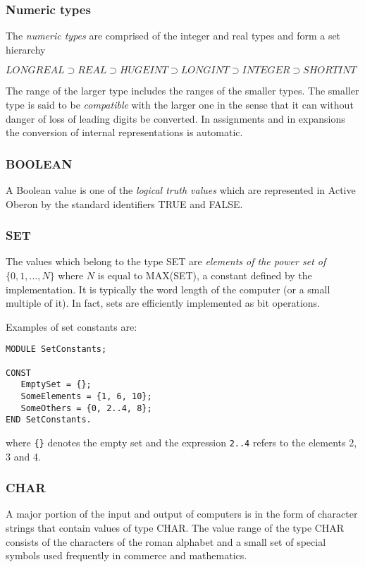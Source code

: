 \documentclass[a4paper,11pt]{article}
\begin{document}
\subsubsection{Numeric types} \label{section:HierarchyNumericTypes}
The {\em numeric types} are comprised of the integer and real types and form a set hierarchy

$LONGREAL \supset REAL \supset HUGEINT \supset LONGINT \supset INTEGER \supset SHORTINT$

The range of the larger type includes the ranges of the smaller types. The smaller type is said to be {\em compatible} with the larger one in the sense that it can without danger of loss of leading digits be converted. In assignments and in expansions the conversion of internal representations is automatic.

\subsubsection{BOOLEAN} \label{section:BooleanType}
A Boolean value is one of the {\em logical truth values} which are represented in Active Oberon by the standard identifiers TRUE and FALSE.

\subsubsection{SET} \label{section:SetType}
The values which belong to the type SET are {\em elements of the power set of} $\{0, 1, \ldots, N\}$ where $N$ is equal to MAX(SET), a constant defined by the implementation. It is typically the word length of the computer (or a small multiple of it). In fact, sets are efficiently implemented as bit operations.

Examples of set constants are:
\begin{lstlisting}[language=Oberon,frame=none,caption=Using set constants]
MODULE SetConstants;

CONST
   EmptySet = {};
   SomeElements = {1, 6, 10};
   SomeOthers = {0, 2..4, 8};
END SetConstants.
\end{lstlisting}

where \verb+{}+ denotes the empty set and the expression \verb+2..4+ refers to the elements 2, 3 and 4.

\subsubsection{CHAR}
A major portion of the input and output of computers is in the form of character strings that contain values of type CHAR. The value range of the type CHAR consists of the characters of the roman alphabet and a small set of special symbols used frequently in commerce and mathematics.
\end{document}
